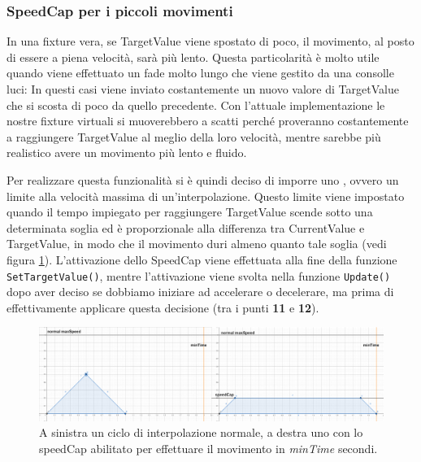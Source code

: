 \documentclass[main.tex]{subfiles}
\begin{document}
\subsubsection{SpeedCap per i piccoli movimenti}\label{subsubsec:4_2_Speedcap}
In una fixture vera, se TargetValue viene spostato di poco, il movimento, al posto di essere a piena velocità, sarà più lento. Questa particolarità è molto utile quando viene effettuato un fade molto lungo che viene gestito da una consolle luci: In questi casi viene inviato costantemente un nuovo valore di TargetValue che si scosta di poco da quello precedente. Con l'attuale implementazione le nostre fixture virtuali si muoverebbero a scatti perché proveranno costantemente a raggiungere TargetValue al meglio della loro velocità, mentre sarebbe più realistico avere un movimento più lento e fluido. 

Per realizzare questa funzionalità si è quindi deciso di imporre uno , ovvero un limite alla velocità massima di un'interpolazione. Questo limite viene impostato quando il tempo impiegato per raggiungere TargetValue scende sotto una determinata soglia ed è proporzionale alla differenza tra CurrentValue e TargetValue, in modo che il movimento duri almeno quanto tale soglia (vedi figura \ref{fig:4_speedCapIntro}). L'attivazione dello SpeedCap viene effettuata alla fine della funzione \lstinline{SetTargetValue()}, mentre l'attivazione viene svolta nella funzione \lstinline{Update()} dopo aver deciso se dobbiamo iniziare ad accelerare o decelerare, ma prima di effettivamente applicare questa decisione (tra i punti \textbf{11} e \textbf{12}). \newline
\begin{figure}[H]
    \centering
    \includegraphics[width=1\linewidth]{img/interpolazione/speedCapIntro.png}
    \caption{A sinistra un ciclo di interpolazione normale, a destra uno con lo speedCap abilitato per effettuare il movimento in \textit{minTime} secondi.}
    \label{fig:4_speedCapIntro}
\end{figure}
\end{document}
